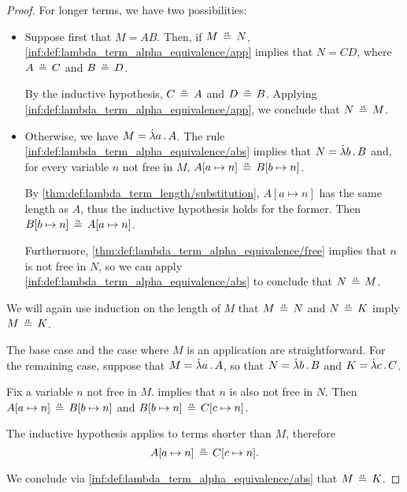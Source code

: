 \begin{proof}
  For longer terms, we have two possibilities:
  \begin{itemize}
    \item Suppose first that \( M = AB \). Then, if \( M \aequiv N \), \ref{inf:def:lambda_term_alpha_equivalence/app} implies that \( N = CD \), where \( A \aequiv C \) and \( B \aequiv D \).

    By the inductive hypothesis, \( C \aequiv A \) and \( D \aequiv B \). Applying \ref{inf:def:lambda_term_alpha_equivalence/app}, we conclude that \( N \aequiv M \).

    \item Otherwise, we have \( M = \qabs a A \). The rule \ref{inf:def:lambda_term_alpha_equivalence/abs} implies that \( N = \qabs b B \) and, for every variable \( n \) not free in \( M \), \( A[a \mapsto n] \aequiv B[b \mapsto n] \).

    By \cref{thm:def:lambda_term_length/substitution}, \( A[a \mapsto n] \) has the same length as \( A \), thus the inductive hypothesis holds for the former. Then \( B[b \mapsto n] \aequiv A[a \mapsto n] \).

    Furthermore, \cref{thm:def:lambda_term_alpha_equivalence/free} implies that \( n \) is not free in \( N \), so we can apply \ref{inf:def:lambda_term_alpha_equivalence/abs} to conclude that \( N \aequiv M \).
  \end{itemize}

   We will again use induction on the length of \( M \) that \( M \aequiv N \) and \( N \aequiv K \) imply \( M \aequiv K \).

  The base case and the case where \( M \) is an application are straightforward. For the remaining case, suppose that \( M = \qabs a A \), so that \( N = \qabs b B \) and \( K = \qabs c C \).

  Fix a variable \( n \) not free in \( M \).  implies that \( n \) is also not free in \( N \). Then \( A[a \mapsto n] \aequiv B[b \mapsto n] \) and \( B[b \mapsto n] \aequiv C[c \mapsto n] \).

  The inductive hypothesis applies to terms shorter than \( M \), therefore
  \begin{equation*}
    A[a \mapsto n] \aequiv C[c \mapsto n].
  \end{equation*}

  We conclude via \ref{inf:def:lambda_term_alpha_equivalence/abs} that \( M \aequiv K \).
\end{proof}

